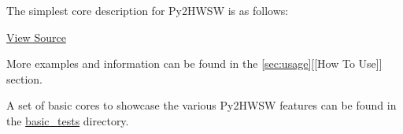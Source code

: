 %

The simplest core description for Py2HWSW is as follows:


\href{https://github.com/IObundle/py2hwsw/blob/main/py2hwsw/lib/hardware/basic_tests/iob_and/iob_and.py}{View Source}

More examples and information can be found in the \ref{sec:usage}[[How To Use]] section.

A set of basic cores to showcase the various Py2HWSW features can be found in
the \href{https://github.com/IObundle/py2hwsw/tree/main/py2hwsw/lib/hardware/basic_tests}{basic\_tests}
directory.

